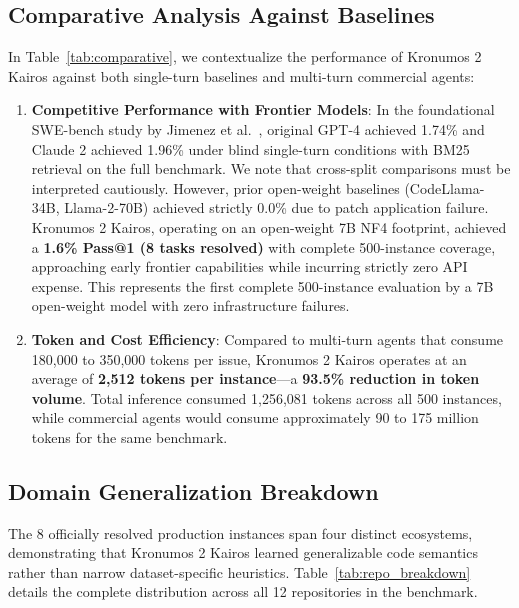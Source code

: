 \documentclass[10pt,twocolumn,letterpaper]{article}
\begin{document}
\subsection{Comparative Analysis Against Baselines}
In Table~\ref{tab:comparative}, we contextualize the performance of Kronumos 2 Kairos against both single-turn baselines and multi-turn commercial agents:
\begin{enumerate}
    \item \textbf{Competitive Performance with Frontier Models}: In the foundational SWE-bench study by Jimenez et al.~\cite{jimenez2024swebench}, original GPT-4 achieved 1.74\% and Claude 2 achieved 1.96\% under blind single-turn conditions with BM25 retrieval on the full benchmark. We note that cross-split comparisons must be interpreted cautiously. However, prior open-weight baselines (CodeLlama-34B, Llama-2-70B) achieved strictly 0.0\% due to patch application failure. Kronumos 2 Kairos, operating on an open-weight 7B NF4 footprint, achieved a \textbf{1.6\% Pass@1 (8 tasks resolved)} with complete 500-instance coverage, approaching early frontier capabilities while incurring strictly zero API expense. This represents the first complete 500-instance evaluation by a 7B open-weight model with zero infrastructure failures.
    \item \textbf{Token and Cost Efficiency}: Compared to multi-turn agents that consume 180,000 to 350,000 tokens per issue, Kronumos 2 Kairos operates at an average of \textbf{2,512 tokens per instance}---a \textbf{93.5\% reduction in token volume}. Total inference consumed 1,256,081 tokens across all 500 instances, while commercial agents would consume approximately 90 to 175 million tokens for the same benchmark.
\end{enumerate}

\subsection{Domain Generalization Breakdown}
The 8 officially resolved production instances span four distinct ecosystems, demonstrating that Kronumos 2 Kairos learned generalizable code semantics rather than narrow dataset-specific heuristics. Table~\ref{tab:repo_breakdown} details the complete distribution across all 12 repositories in the benchmark.
\end{document}
